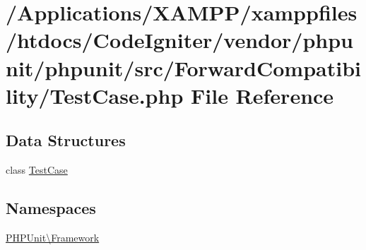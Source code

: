 \hypertarget{phpunit_2src_2_forward_compatibility_2_test_case_8php}{}\section{/\+Applications/\+X\+A\+M\+P\+P/xamppfiles/htdocs/\+Code\+Igniter/vendor/phpunit/phpunit/src/\+Forward\+Compatibility/\+Test\+Case.php File Reference}
\label{phpunit_2src_2_forward_compatibility_2_test_case_8php}
\subsection*{Data Structures}
\begin{DoxyCompactItemize}
\item 
class \mbox{\hyperlink{class_p_h_p_unit_1_1_framework_1_1_test_case}{Test\+Case}}
\end{DoxyCompactItemize}
\subsection*{Namespaces}
\begin{DoxyCompactItemize}
\item 
 \mbox{\hyperlink{namespace_p_h_p_unit_1_1_framework}{P\+H\+P\+Unit\textbackslash{}\+Framework}}
\end{DoxyCompactItemize}
